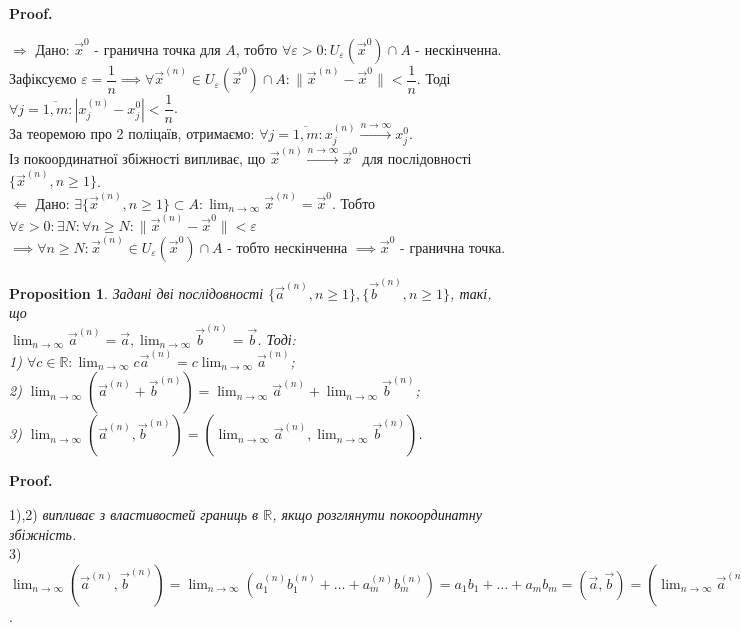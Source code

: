 \documentclass[a4paper, 10pt]{article}
\makeatletter
\def\huge{\displaystyle}
\def\qed{$\blacksquare$}
\def\rightproof{$\boxed{\Rightarrow}$ }
\def\leftproof{$\boxed{\Leftarrow}$ }
\theoremstyle{theoremdd}
\theoremstyle{theoremdd}
\theoremstyle{theoremdd}
\theoremstyle{theoremdd}
\theoremstyle{theoremdd}
\newtheorem{proposition}[theorem]{Proposition}
\theoremstyle{theoremdd}
\theoremstyle{theoremdd}
\theoremstyle{theoremdd}
\renewenvironment{proof}[1][Proof.\\]{\par
\pushQED{\hfill \qed}%
\normalfont \topsep6\p@\@plus6\p@\relax
\trivlist
\item\relax
{\bfseries
#1\@addpunct{.}}\hspace\labelsep\ignorespaces
}{%
\popQED\endtrivlist\@endpefalse
}
\newcommand\Norm[1]{\lVert#1\rVert}
\makeatother
\begin{document}
\begin{proof}
\rightproof Дано: $\vec{x}^0$ - гранична точка для $A$, тобто $\forall \varepsilon > 0: U_{\varepsilon}(\vec{x}^0) \cap A$ - нескінченна.\\
Зафіксуємо $\varepsilon = \dfrac{1}{n} \implies \forall \vec{x}^{(n)} \in U_{\varepsilon}(\vec{x}^0) \cap A: \Norm{\vec{x}^{(n)} - \vec{x}^0} < \dfrac{1}{n}$. Тоді $\forall j = \overline{1,m}: |x_j^{(n)} - x_j^0| < \dfrac{1}{n}$.\\
За теоремою про 2 поліцаїв, отримаємо: $\forall j = \overline{1,m}: x_j^{(n)} \overset{n \to \infty}{\longrightarrow} x_j^0$.\\
Із покоординатної збіжності випливає, що $\vec{x}^{(n)} \overset{n \to \infty}{\longrightarrow} \vec{x}^0$ для послідовності $\{\vec{x}^{(n)}, n \geq 1\}$.
\bigskip \\

\leftproof Дано: $\exists \{\vec{x}^{(n)}, n \geq 1\} \subset A: \huge \lim_{n \to \infty} \vec{x}^{(n)} = \vec{x}^0$. Тобто $\forall \varepsilon > 0: \exists N: \forall n \geq N: \Norm{\vec{x}^{(n)} - \vec{x}^0} < \varepsilon$\\
$\implies \forall n \geq N: \vec{x}^{(n)} \in U_\varepsilon(\vec{x}^0) \cap A$ - тобто нескінченна $\implies \vec{x}^{0}$ - гранична точка.
\end{proof}

\begin{proposition}
Задані дві послідовності $\{\vec{a}^{(n)}, n \geq 1\}, \{\vec{b}^{(n)}, n \geq 1\}$, такі, що \\ $\huge \lim_{n \to \infty} \vec{a}^{(n)} = \vec{a}, \lim_{n \to \infty} \vec{b}^{(n)} = \vec{b}$. Тоді:\\
1) $\forall c \in \mathbb{R}: \huge \lim_{n \to \infty} c \vec{a}^{(n)} = c \lim_{n \to \infty} \vec{a}^{(n)}$;\\
2) $\huge \lim_{n \to \infty} (\vec{a}^{(n)} + \vec{b}^{(n)}) = \lim_{n \to \infty} \vec{a}^{(n)} + \lim_{n \to \infty} \vec{b}^{(n)}$;\\
3) $\huge \lim_{n \to \infty} (\vec{a}^{(n)}, \vec{b}^{(n)}) = \left(\lim_{n \to \infty} \vec{a}^{(n)}, \lim_{n \to \infty} \vec{b}^{(n)}\right)$.
\end{proposition}
\begin{proof}
1),2) \textit{випливає з властивостей границь в $\mathbb{R}$, якщо розглянути покоординатну збіжність.}
\bigskip \\
3) $\huge \lim_{n \to \infty} (\vec{a}^{(n)}, \vec{b}^{(n)}) = \lim_{n \to \infty} (a_1^{(n)}b_1^{(n)} + \dots + a_m^{(n)}b_m^{(n)}) = a_1b_1 + \dots + a_m b_m = (\vec{a}, \vec{b}) = \left(\lim_{n \to \infty} \vec{a}^{(n)}, \lim_{n \to \infty} \vec{b}^{(n)}\right)$.
\end{proof}
\end{document}
